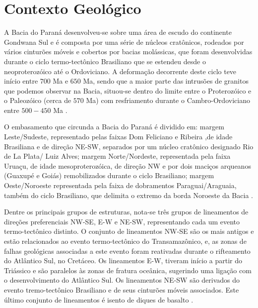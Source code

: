 \chapter{Contexto Geológico}
A Bacia do Paraná desenvolveu-se sobre uma área de escudo do continente Gondwana Sul e é composta por uma série de núcleos cratônicos, rodeados por vários cinturões móveis e cobertos por bacias molássicas, que foram desenvolvidas durante o ciclo termo-tectônico Brasiliano que se estendeu desde o neoproterozóico até o Ordoviciano. A deformação decorrente deste ciclo teve início entre $700$ Ma e $650$ Ma, sendo que a maior parte das intrusões de granitos que podemos observar na Bacia, situou-se dentro do limite entre o Proterozóico e o Paleozóico (cerca de $570$ Ma) com resfriamento durante o Cambro-Ordoviciano entre $500-450$ Ma \citep{zalan_p._v._tectonica_1987, hawkesworth_tectonic_2000}.

O embasamento que circunda a Bacia do Paraná é dividido em: margem Leste/Sudeste, representado pelas faixas Dom Feliciano e Ribeira ,de idade Brasiliana e de direção NE-SW, separados por um núcleo cratônico designado Rio de La Plata/ Luiz Alves; margem Norte/Nordeste, representada pela faixa Uruaçu, de idade mesoproterozóica, de direção NW e por dois maciços arqueanos (Guaxupé e Goiás) remobilizados durante o ciclo Brasiliano; margem Oeste/Noroeste representada pela faixa de dobramentos Paraguai/Araguaia, também do ciclo Brasiliano, que delimita o extremo da borda Noroeste da Bacia \citep{borghi_2002, hawkesworth_tectonic_2000}.

Dentre os principais grupos de estruturas, nota-se três grupos de lineamentos de direções preferenciais NW-SE, E-W e NE-SW, representando cada um evento termo-tectônico distinto. O conjunto de lineamentos NW-SE são os mais antigos e estão relacionados ao evento  termo-tectônico do Transamazônico, e, as zonas de falhas geológicas associadas a este evento foram reativadas durante o rifteamento do Atlântico Sul, no Cretáceo.  Os lineamentos E-W, tiveram início a partir do Triássico e são paralelos às zonas de fratura oceânica, sugerindo uma ligação com o desenvolvimento do Atlântico Sul. Os lineamentos NE-SW são derivados do evento tremo-tectônico Brasiliano e de seus cinturões móveis associados. Este último conjunto de lineamentos é isento de diques de basalto \citep{milani_outline_1999}. 

